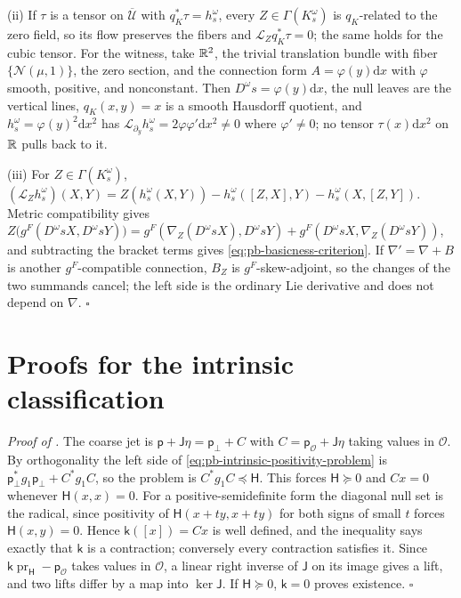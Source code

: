 (ii) If \(\tau\) is a tensor on \(\overline{\mathcal U}\) with \(q_K^*\tau=h_s^\omega\), every
\(Z\in\Gamma(K_s^\omega)\) is \(q_K\)-related to the zero field, so its flow preserves the fibers and
\(\mathcal L_Zq_K^*\tau=0\); the same holds for the cubic tensor. For the witness, take \(\mathbb R^2\), the
trivial translation bundle with fiber \(\{\mathcal N(\mu,1)\}\), the zero section, and the connection
form \(A=\varphi(y)\mathrm dx\) with \(\varphi\) smooth, positive, and nonconstant. Then
\(D^\omega s=\varphi(y)\mathrm dx\), the null leaves are the vertical lines, \(q_K(x,y)=x\) is a smooth
Hausdorff quotient, and \(h_s^\omega=\varphi(y)^2\mathrm dx^2\) has
\(\mathcal L_{\partial_y}h_s^\omega=2\varphi\varphi'\mathrm dx^2\neq0\) where \(\varphi'\neq0\); no
tensor \(\tau(x)\mathrm dx^2\) on \(\mathbb R\) pulls back to it.

(iii) For \(Z\in\Gamma(K_s^\omega)\),
\((\mathcal L_Zh_s^\omega)(X,Y)=Z(h_s^\omega(X,Y))-h_s^\omega([Z,X],Y)-h_s^\omega(X,[Z,Y])\). Metric
compatibility gives
\(Z\bigl(g^F(D^\omega sX,D^\omega sY)\bigr)=g^F(\nabla_Z(D^\omega sX),D^\omega sY)+g^F(D^\omega sX,\nabla_Z(D^\omega sY))\),
and subtracting the bracket terms gives \eqref{eq:pb-basicness-criterion}. If
\(\nabla'=\nabla+B\) is another \(g^F\)-compatible connection, \(B_Z\) is \(g^F\)-skew-adjoint, so the
changes of the two summands cancel; the left side is the ordinary Lie derivative and does not depend on
\(\nabla\). \hfill$\square$

\section{Proofs for the intrinsic classification}
\label{sec:app-base-classification}

\noindent\emph{Proof of .}
The coarse jet is \(\mathsf p+\mathsf J\eta=\mathsf p_\perp+C\) with
\(C=\mathsf p_{\mathcal O}+\mathsf J\eta\) taking values in \(\mathcal O\). By orthogonality the left side
of \eqref{eq:pb-intrinsic-positivity-problem} is \(\mathsf p_\perp^*g_1\mathsf p_\perp+C^*g_1C\), so the
problem is \(C^*g_1C\preceq\mathsf H\). This forces \(\mathsf H\succeq0\) and \(Cx=0\) whenever
\(\mathsf H(x,x)=0\). For a positive-semidefinite form the diagonal null set is the radical, since
positivity of \(\mathsf H(x+ty,x+ty)\) for both signs of small \(t\) forces \(\mathsf H(x,y)=0\). Hence
\(\mathsf k([x])=Cx\) is well defined, and the inequality says exactly that \(\mathsf k\) is a
contraction; conversely every contraction satisfies it. Since
\(\mathsf k\operatorname{pr}_{\mathsf H}-\mathsf p_{\mathcal O}\) takes values in \(\mathcal O\), a linear
right inverse of \(\mathsf J\) on its image gives a lift, and two lifts differ by a map into
\(\ker\mathsf J\). If \(\mathsf H\succeq0\), \(\mathsf k=0\) proves existence. \hfill$\square$

